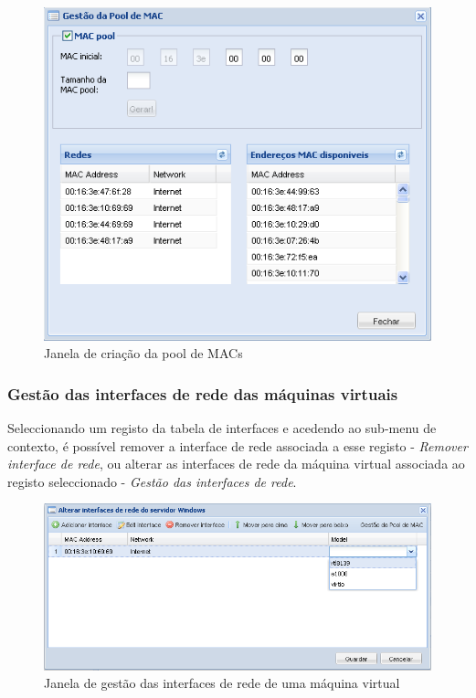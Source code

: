 \begin{figure}[H]
	\begin{center}
	\includegraphics[scale=0.5]{screenshots/networks_macpool.png}
	\caption{Janela de criação da pool de MACs}
	\label{fig:networks_macpool}
	\end{center}
\end{figure}


\subsubsection{Gestão das interfaces de rede das máquinas virtuais}
Seleccionando um registo da tabela de interfaces e acedendo ao sub-menu de contexto, é possível remover a interface de rede associada a esse registo - \emph{Remover interface de rede}, ou alterar as interfaces de rede da máquina virtual associada ao registo seleccionado - \emph{Gestão das interfaces de rede}.

\begin{figure}[H]
	\begin{center}
	\includegraphics[scale=0.5]{screenshots/nics.png}
	\caption{Janela de gestão das interfaces de rede de uma máquina virtual}
	\label{fig:nics}
	\end{center}
\end{figure}

